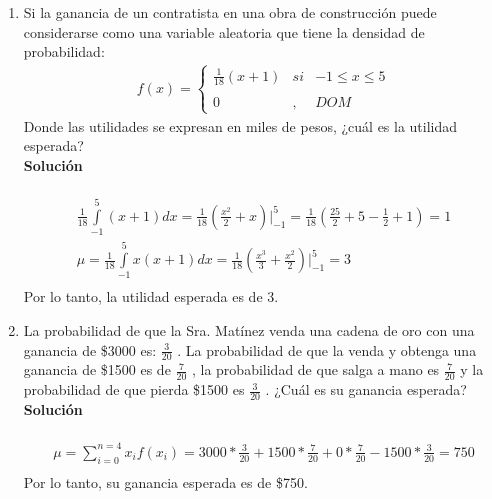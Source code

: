 \begin{enumerate}
    \item Si la ganancia de un contratista en una obra de construcción puede considerarse como una variable aleatoria que tiene la densidad de probabilidad: \\
    \begin{align*}
    f(x)= \left\{ \begin{array}{lcc}
    \frac{1}{18}(x + 1) &   si  & -1 \leq x \leq 5 \\
    \\ 0 &  ,  & DOM
    \end{array}
    \right.
    \end{align*}
    Donde las utilidades se expresan en miles de pesos, ¿cuál es la utilidad esperada?
    \\\textbf{Solución}
    \\ \\
    \begin{gather*}
    \frac{1}{18} \int \limits_{-1}^{5} (x+1) dx = \frac{1}{18}(\frac{x^2}{2} + x) \bigg\vert_{-1}^5 = \frac{1}{18}(\frac{25}{2} + 5 - \frac{1}{2} + 1) = 1 \\
    \mu = \frac{1}{18} \int \limits_{-1}^{5} x(x+1) dx = \frac{1}{18}(\frac{x^3}{3} + \frac{x^2}{2}) \bigg\vert_{-1}^5 = 3 \\
    \end{gather*}
    Por lo tanto, la utilidad esperada es de 3. \\
    
    \item La probabilidad de que la Sra. Matínez venda una cadena de oro con una ganancia de \$3000 es: $ \frac{3}{20} $ . La probabilidad de que la venda y obtenga una ganancia de \$1500 es de $ \frac{7}{20} $ , la probabilidad de que salga a mano es $ \frac{7}{20} $ y la probabilidad de que pierda \$1500 es $ \frac{3}{20} $ . ¿Cuál es su ganancia esperada?
    \\\textbf{Solución}
    \\ \\
    \begin{gather*}
    \mu = \sum_{i = 0}^{n = 4} x_{i}f(x_{i}) = 3000*\frac{3}{20} + 1500*\frac{7}{20} + 0*\frac{7}{20} - 1500*\frac{3}{20} = 750 \\
    \end{gather*}
    Por lo tanto, su ganancia esperada es de \$750. \\
    

\end{enumerate}
